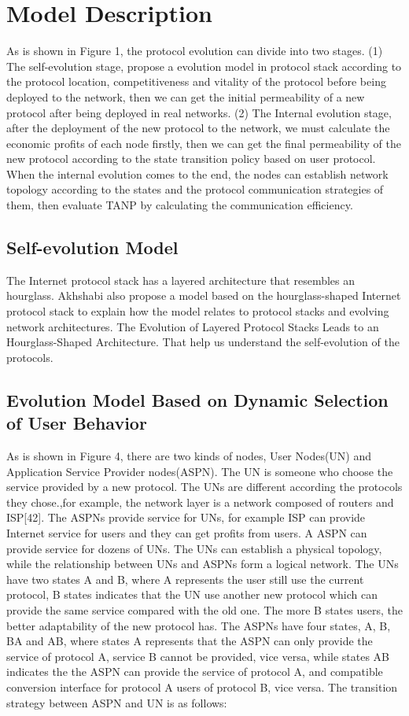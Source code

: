 \documentclass{article}
\begin{document}
\section{Model Description}
As is shown in Figure 1, the protocol evolution can divide into two stages. (1) The self-evolution stage, propose a evolution model in protocol stack according to the protocol location, competitiveness and vitality of the protocol before being deployed to the network, then we can get the initial permeability of a new protocol after being deployed in real networks. (2) The Internal evolution stage, after the deployment of the new protocol to the network, we must calculate the economic profits of each node firstly, then we can get the final permeability of the new protocol according to the state transition policy based on user protocol. When the internal evolution comes to the end, the nodes can establish network topology according to the states and the protocol communication strategies of them,  then evaluate TANP by calculating the communication efficiency. 
\subsection{Self-evolution Model}
The Internet protocol stack has a layered architecture that resembles an hourglass. Akhshabi also propose a model based on the hourglass-shaped Internet protocol stack to explain  how the model relates to protocol stacks and evolving network architectures. The Evolution of Layered Protocol Stacks Leads to an Hourglass-Shaped Architecture. That help us understand the self-evolution of the protocols. 
\subsection{Evolution Model Based on Dynamic Selection of User Behavior}
As is shown in Figure 4, there are two kinds of nodes, User Nodes(UN) and Application Service Provider nodes(ASPN). The UN is someone who choose the service provided by a new protocol. The UNs are different according the protocols they chose.,for example, the network layer is a network composed of routers and ISP[42]. The ASPNs provide service for UNs, for example ISP can provide Internet service for users and they can get profits from users. A ASPN can provide service for dozens of UNs. The UNs can establish a physical topology, while the relationship between UNs and ASPNs form a logical network. The UNs have two states A and B, where A represents the user still use the current protocol, B states indicates that the UN use another new protocol which can provide the same service compared with the old one.  The more B states users, the better adaptability of the new protocol has. The ASPNs have four states, A, B, BA and AB, where states A represents that the ASPN can only provide the service of protocol A, service B cannot be provided, vice versa, while states AB indicates the the ASPN can provide the service of protocol A, and compatible conversion interface for protocol A users of protocol B, vice versa. 
The transition strategy between ASPN and UN is as follows:
\end{document}
